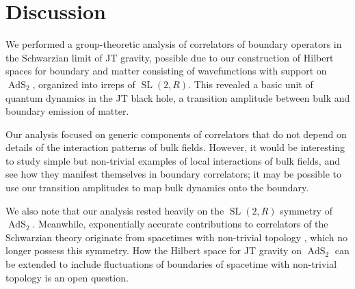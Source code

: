 \documentclass[12pt]{article}
\newcommand{\nn}{\nonumber\\}
\newcommand{\blangle}{\bigl\langle}
\newcommand{\brangle}{\bigr\rangle}
\newcommand*{\bcorr}[1]{\blangle{#1}\brangle}
\newcommand{\calO}{\mathcal{O}}
\newcommand{\RR}{\mathbb{R}}
\DeclareMathOperator{\tr}{tr}
\DeclareMathOperator{\tSL}{\widetilde{\mathrm{SL}}}
\DeclareMathOperator{\tAdS}{\widetilde{AdS}}
\newcommand{\Rho}{\mathrm{P}}
\newcommand{\Ga}{\Gamma}
\newcommand{\De}{\Delta}
\def\widetilde#1{#1}%
\def\RR{R}
\begin{document}



\section{Discussion}

We performed a group-theoretic analysis of correlators of boundary operators in the Schwarzian limit of JT gravity, possible due to our construction of Hilbert spaces for boundary and matter consisting of wavefunctions with support on $\tAdS_2$, organized into irreps of $\tSL(2,\RR)$. This revealed a basic unit of quantum dynamics in the JT black hole, a transition amplitude between bulk and boundary emission of matter. 

Our analysis focused on generic components of correlators that do not depend on details of the interaction patterns of bulk fields. However, it would be interesting to study simple but non-trivial examples of local interactions of bulk fields, and see how they manifest themselves in boundary correlators; it may be possible to use our transition amplitudes to map bulk dynamics onto the boundary.

We also note that our analysis rested heavily on the $\tSL(2,\RR)$ symmetry of $\tAdS_2$. Meanwhile, exponentially accurate contributions to correlators of the Schwarzian theory originate from spacetimes with non-trivial topology \cite{Saad19}, which no longer possess this symmetry. How the Hilbert space for JT gravity on $\tAdS_2$ can be extended to include fluctuations of boundaries of spacetime with non-trivial topology is an open question.
\end{document}
